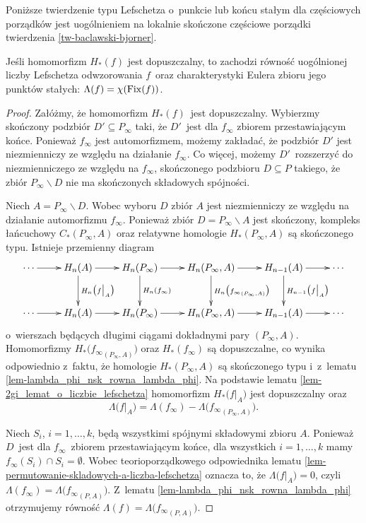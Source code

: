 Poniższe twierdzenie typu Lefschetza o~punkcie lub końcu stałym dla częściowych porządków jest uogólnieniem na lokalnie skończone częściowe porządki twierdzenia \ref{tw-baclawski-bjorner}.

\begin{tw}\label{tw-order-theoretic-fixed-point-or-end-theorem}
Jeśli homomorfizm $H_*(f)$ jest dopuszczalny, to zachodzi równość uogólnionej liczby Lefschetza odwzorowania $f$~oraz charakterystyki Eulera zbioru jego punktów stałych: $\Lambda(f)=\chi(\operatorname{Fix}(f))$.
\end{tw}
\begin{proof}
Załóżmy, że homomorfizm $H_*(f)$~jest dopuszczalny. Wybierzmy skończony podzbiór $D'\subseteq P_\infty$ taki, że $D'$~jest dla $f_\infty$ zbiorem przestawiającym końce. Ponieważ $f_\infty$ jest automorfizmem, możemy zakładać, że podzbiór $D'$ jest niezmienniczy ze względu na działanie $f_\infty$. Co więcej, możemy $D'$~rozszerzyć do niezmienniczego ze względu na $f_\infty$, skończonego podzbioru $D\subseteq P$ takiego, że zbiór $P_\infty\smallsetminus D$ nie ma skończonych składowych spójności.

Niech $A=P_\infty\smallsetminus D$. Wobec wyboru $D$ zbiór $A$ jest niezmienniczy ze względu na działanie automorfizmu $f_\infty$. Ponieważ zbiór $D=P_\infty\smallsetminus A$ jest skończony, kompleks łańcuchowy $C_*(P_\infty,A)$ oraz relatywne homologie $H_*(P_\infty,A)$ są skończonego typu. Istnieje przemienny diagram
\[
\xymatrix@R=30pt{\cdots\ar[r]& H_n(A)\ar[r]\ar[d]^{H_n\bigl(f\big |_A\bigr)}& H_n(P_\infty)\ar[r]\ar[d]^{H_n(f_\infty)} & H_n(P_\infty,A)\ar[r]\ar[d]^{H_n\bigl({f_\infty}_{(P_\infty,A)}\bigr)} & H_{n-1}(A)\ar[r]\ar[d]^{H_{n-1}\bigl(f\big |_A\bigr)} & \cdots\\
\cdots\ar[r]& H_n(A)\ar[r]& H_n(P_\infty)\ar[r] & H_n(P_\infty,A)\ar[r] & H_{n-1}(A)\ar[r] & \cdots}
\]
o~wierszach będących długimi ciągami dokładnymi pary $(P_\infty,A)$.
Homomorfizmy $H_*\bigl({f_\infty}_{(P_\infty,A)}\bigr)$ oraz $H_*(f_\infty)$ są dopuszczalne, co wynika odpowiednio z~faktu, że homologie $H_*(P_\infty,A)$ są skończonego typu i~z~lematu \ref{lem-lambda_phi_nsk_rowna_lambda_phi}. Na podstawie lematu \ref{lem-2gi_lemat_o_liczbie_lefschetza} homomorfizm $H_*\bigl(f\big |_A\bigr)$ jest dopuszczalny oraz \[\Lambda\bigl(f\big |_A\bigr)=\Lambda(f_\infty)-\Lambda\bigl({f_\infty}_{(P_\infty,A)}\bigr).\]

Niech $S_i$, $i=1,\ldots,k$, będą wszystkimi spójnymi składowymi zbioru $A$. Ponieważ $D$~jest dla $f_\infty$~zbiorem przestawiającym końce, dla wszystkich $i=1,\ldots,k$ mamy $f_\infty(S_i)\cap S_i=\emptyset$. Wobec teorioporządkowego odpowiednika lematu \ref{lem-permutowanie-skladowych-a-liczba-lefschetza} oznacza to, że $\Lambda\bigl(f\big |_A\bigr)=0$, czyli $\Lambda(f_\infty)=\Lambda\bigl({f_\infty}_{(P,A)}\bigr)$. Z~lematu \ref{lem-lambda_phi_nsk_rowna_lambda_phi} otrzymujemy równość $\Lambda(f)=\Lambda\bigl({f_\infty}_{(P,A)}\bigr)$.


\end{proof}
